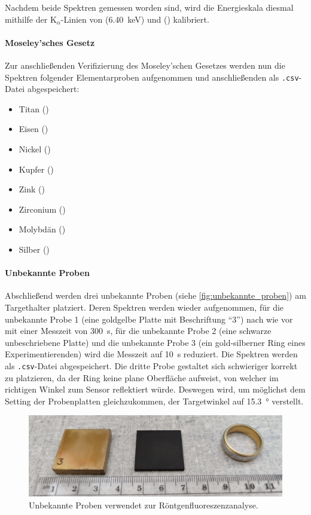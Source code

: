 \documentclass[ngerman]{scrartcl}
\begin{document}
Nachdem beide Spektren gemessen worden sind, wird die Energieskala diesmal mithilfe der K$_\alpha$-Linien von  (\SI{6,40}{keV}) und  () kalibriert.

\paragraph{Moseley'sches Gesetz}
Zur anschließenden Verifizierung des Moseley'schen Gesetzes werden nun die Spektren folgender Elementarproben aufgenommen und anschließenden als \texttt{.csv}-Datei abgespeichert:
\begin{itemize}
    \item Titan ()
    \item Eisen ()
    \item Nickel ()
    \item Kupfer ()
    \item Zink ()
    \item Zirconium ()
    \item Molybdän ()
    \item Silber ()
\end{itemize}

\paragraph{Unbekannte Proben}
Abschließend werden drei unbekannte Proben (siehe \autoref{fig:unbekannte_proben}) am Targethalter platziert. Deren Spektren werden wieder aufgenommen, für die unbekannte Probe 1 (eine goldgelbe Platte mit Beschriftung \enquote{3}) nach wie vor mit einer Messzeit von \SI{300}{s}, für die unbekannte Probe 2 (eine schwarze unbeschriebene Platte) und die unbekannte Probe 3 (ein gold-silberner Ring eines Experimentierenden) wird die Messzeit auf \SI{10}{s} reduziert. Die Spektren werden als \texttt{.csv}-Datei abgespeichert. Die dritte Probe gestaltet sich schwieriger korrekt zu platzieren, da der Ring keine plane Oberfläche aufweist, von welcher im richtigen Winkel zum Sensor reflektiert würde. Deswegen wird, um möglichst dem Setting der Probenplatten gleichzukommen, der Targetwinkel auf \SI{15.3}{\degree} verstellt.
%
\begin{figure}[H]
    \centering
    \begin{samepage}
        \includegraphics[width=\linewidth]{fig/unbekannt.png}
        \caption[Unbekannte Proben]{Unbekannte Proben verwendet zur Röntgenfluoreszenzanalyse.}
        \label{fig:unbekannte_proben}
    \end{samepage}
\end{figure}
\end{document}
